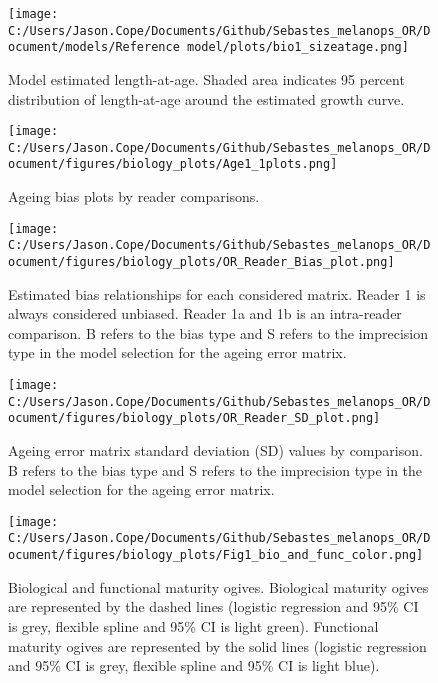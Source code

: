 \documentclass[11pt,
  english,
  letterpaper,
]{article}
\begin{document}
\begin{figure}
\centering
\texttt{[image: C:/Users/Jason.Cope/Documents/Github/Sebastes\_melanops\_OR/Document/models/Reference model/plots/bio1\_sizeatage.png]}
\caption{Model estimated length-at-age. Shaded area indicates 95 percent distribution of length-at-age around the estimated growth curve.\label{fig:len-age-ss}}
\end{figure}

\clearpage

\begin{figure}
\centering
\texttt{[image: C:/Users/Jason.Cope/Documents/Github/Sebastes\_melanops\_OR/Document/figures/biology\_plots/Age1\_1plots.png]}
\caption{Ageing bias plots by reader comparisons.\label{fig:age-bias_plot}}
\end{figure}

\begin{figure}
\centering
\texttt{[image: C:/Users/Jason.Cope/Documents/Github/Sebastes\_melanops\_OR/Document/figures/biology\_plots/OR\_Reader\_Bias\_plot.png]}
\caption{Estimated bias relationships for each considered matrix. Reader 1 is always considered unbiased. Reader 1a and 1b is an intra-reader comparison. B refers to the bias type and S refers to the imprecision type in the model selection for the ageing error matrix.\label{fig:age-error-bias}}
\end{figure}

\begin{figure}
\centering
\texttt{[image: C:/Users/Jason.Cope/Documents/Github/Sebastes\_melanops\_OR/Document/figures/biology\_plots/OR\_Reader\_SD\_plot.png]}
\caption{Ageing error matrix standard deviation (SD) values by comparison. B refers to the bias type and S refers to the imprecision type in the model selection for the ageing error matrix.\label{fig:age-error-sd}}
\end{figure}

\begin{figure}
\centering
\texttt{[image: C:/Users/Jason.Cope/Documents/Github/Sebastes\_melanops\_OR/Document/figures/biology\_plots/Fig1\_bio\_and\_func\_color.png]}
\caption{Biological and functional maturity ogives. Biological maturity ogives are represented by the dashed lines (logistic regression and 95\% CI is grey, flexible spline and 95\% CI is light green). Functional maturity ogives are represented by the solid lines (logistic regression and 95\% CI is grey, flexible spline and 95\% CI is light blue).\label{fig:bio-fxn-mat-color}}
\end{figure}
\end{document}
